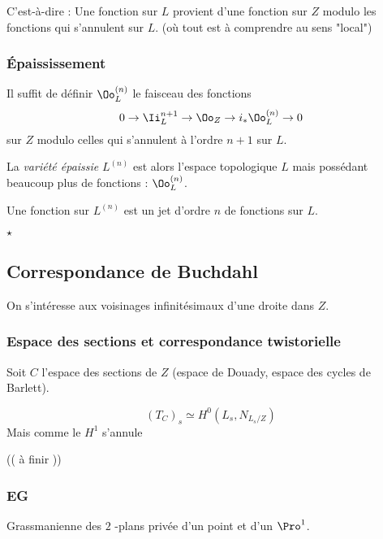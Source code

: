 \documentclass[12pt,makeidx]{amsart}
\begin{document}
C'est-à-dire : Une fonction sur \(L\) provient d'une fonction sur \(Z\) modulo les fonctions qui s'annulent sur \(L\). (où tout est à comprendre au sens "local")

\subsubsection{Épaississement}
\label{sec:orgheadline3}
Il suffit de définir \(\Oo_L^{(n)}\) le faisceau des fonctions
\[
0 \to \Ii^{n+1}_L \to \Oo_Z \to i_* \Oo_L^{(n)} \to 0
\]
sur \(Z\) modulo celles qui s'annulent à l'ordre \(n+1\) sur \(L\).

La \emph{variété épaissie} \(L^{(n)}\) est alors l'espace topologique \(L\) mais possédant beaucoup plus de fonctions : \(\Oo^{(n)}_L\).

Une fonction sur \(L^{(n)}\) est un jet d'ordre \(n\) de fonctions sur \(L\).

{\color{DarkRed}\(\star\)}












\subsection{Correspondance de Buchdahl}
\label{sec:orgheadline10}

On s'intéresse aux voisinages infinitésimaux d'une droite dans \(Z\). 

\subsubsection{Espace des sections et correspondance twistorielle}
\label{sec:orgheadline5}
Soit \(C\) l'espace des sections de \(Z\) (espace de Douady, espace des cycles de Barlett).

\[
(T_C)_s \simeq H^0(L_s, N_{L_s/Z})
\]
Mais comme le \(H^1\) s'annule

(( à finir ))

\subsubsection{EG}
\label{sec:orgheadline6}

Grassmanienne des \(2\) -plans privée d'un point et d'un \(\Pro^1\).
\end{document}

